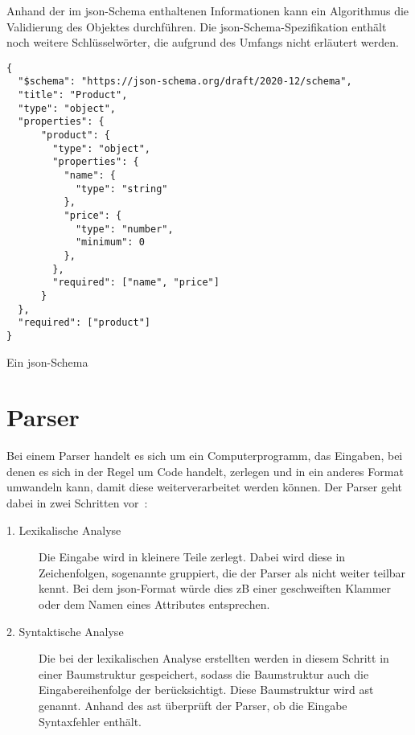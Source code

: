 Anhand der im \acs{json}-Schema enthaltenen Informationen kann ein Algorithmus die Validierung des Objektes durchführen.
Die \acs{json}-Schema-Spezifikation enthält noch weitere Schlüsselwörter, die aufgrund des Umfangs nicht erläutert werden.

\begin{listing}[htp]
      \begin{verbatim}
{
  "$schema": "https://json-schema.org/draft/2020-12/schema",
  "title": "Product",
  "type": "object",
  "properties": {
      "product": {
        "type": "object",
        "properties": {
          "name": {
            "type": "string"
          },
          "price": {
            "type": "number", 
            "minimum": 0
          },
        },
        "required": ["name", "price"]
      }
  },
  "required": ["product"]
}
      \end{verbatim}
      \caption{Ein \acs{json}-Schema}
      \label{lst:json-schema}
\end{listing}

\section{Parser}\label{sec:parser}

Bei einem Parser handelt es sich um ein Computerprogramm, das Eingaben, bei denen es sich in der Regel um Code handelt,
zerlegen und in ein anderes Format umwandeln kann, damit
diese weiterverarbeitet werden können. Der Parser geht dabei in zwei Schritten vor~\cite{parser-tech-target}:

\begin{description}
      \item[1. Lexikalische Analyse]
            Die Eingabe wird in kleinere Teile zerlegt. Dabei wird diese in Zeichenfolgen, sogenannte 
            gruppiert, die der Parser als nicht weiter teilbar kennt. Bei dem \ac{json}-Format würde dies \ac{zB} einer geschweiften Klammer oder
            dem Namen eines Attributes entsprechen.
      \item[2. Syntaktische Analyse]
            Die bei der lexikalischen Analyse erstellten  werden in diesem Schritt in einer Baumstruktur gespeichert, sodass die
            Baumstruktur auch die Eingabereihenfolge der  berücksichtigt. Diese Baumstruktur wird \ac{ast} genannt.
            Anhand des \ac{ast} überprüft der Parser, ob die Eingabe Syntaxfehler enthält.
\end{description}
